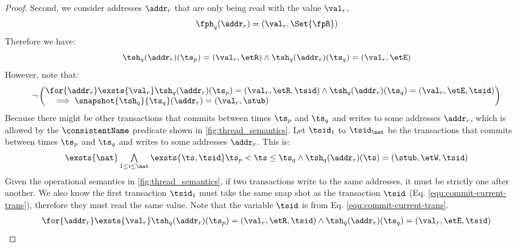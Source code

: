 \begin{proof}
Second, we consider addresses \( \addr_{r} \) that are only being read with the value \( \val_{r} \),
\begin{equation}
    \label{equ:local-read}
    \fph_{q}(\addr_{r}) = (\val_{r}, \Set{\fpR})
\end{equation}
Therefore we have:
\begin{equation}
    \label{equ:tsh-read-value}
    \tsh_{q}(\addr_{r})(\ts_{p}) = (\val_{r}, \etR )
    \land \tsh_{q}(\addr_{r})(\ts_{q}) = (\val_{r}, \etE )
\end{equation}
However, note that:
\[
\neg\left(
    \begin{array}{@{}l@{}}
        \for{\addr_{r}} \exsts{\val_{r}} 
        \tsh_{q}(\addr_{r})(\ts_{p}) = (\val_{r}, \etR, \tsid )
        \land \tsh_{q}(\addr_{r})(\ts_{q}) = (\val_{r}, \etE , \tsid) \\
        \quad \implies \snapshot{\tsh_{q}}{\ts_{q}}(\addr_{r}) = (\val_{r}, \stub)
    \end{array}
\right)
\]
Because there might be other transactions that commits between times \( \ts_{p} \) and \( \ts_{q} \) and writes to some addresses \( \addr_{r} \), which is allowed by the \( \consistentName \) predicate shown in \fig \ref{fig:thread_semantics}.
Let \( \tsid_{1} \) to \( \tsid_{\nat} \) be the transactions that commits between times \( \ts_{p} \) and \( \ts_{q} \) and writes to some addresses \( \addr_{r} \).
This is:
\[
    \begin{array}{@{}l@{}}
        \exsts{\nat} 
        \bigwedge\limits_{1 \leq i \leq \nat} \exsts{\ts, \tsid} \ts_{p} < \ts \leq \ts_{q} 
        \land \tsh_{q}(\addr_{r})(\ts) = (\stub, \etW, \tsid) \\
    \end{array}
\]
Given the operational semantics in \fig \ref{fig:thread_semantics}, if two transactions write to the same addresses, it must be strictly one after another.
We also know the first transaction \( \tsid_{1} \) must take the same snap shot as the transaction \( \tsid \) (Eq. \eqref{equ:commit-current-trans}), therefore they must read the same value.
Note that the variable \( \tsid \) is from Eq. \eqref{equ:commit-current-trans}.
\begin{equation}
\label{equ:other-writes}
    \begin{array}{@{}l@{}}
        \for{\addr_{r}} \exsts{\val_{r}} 
        \tsh_{q}(\addr_{r})(\ts_{p}) = (\val_{r}, \etR, \tsid )
        \land \tsh_{q}(\addr_{r})(\ts_{q}) = (\val_{r}, \etE , \tsid) \\

\end{array}
\end{equation}
\end{proof}
